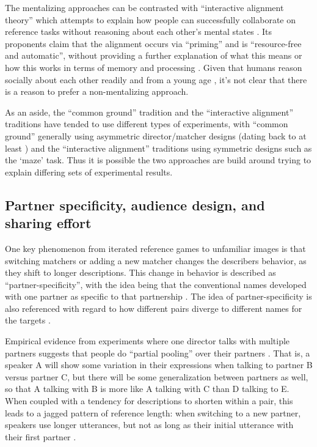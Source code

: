 \documentclass[]{article}
\begin{document}
The mentalizing approaches can be contrasted with ``interactive alignment theory'' which attempts to explain how people can successfully collaborate on reference tasks without reasoning about each other's mental states \citep{pickering2004, gandolfi2022}. Its proponents claim that the alignment occurs via ``priming'' and is ``resource-free and automatic'', without providing a further explanation of what this means or how this works in terms of memory and processing \citep{pickering2004}.  Given that humans reason socially about each other readily and from a young age \citep{rakoczy2022}, it's not clear that there is a reason to prefer a non-mentalizing approach. 

As an aside, the ``common ground'' tradition and the ``interactive alignment'' traditions have tended to use different types of experiments, with ``common ground'' generally using asymmetric director/matcher designs (dating back to at least \citet{krauss1966}) and the ``interactive alignment'' traditions using symmetric designs such as the `maze' task. Thus it is possible the two approaches are build around trying to explain differing sets of experimental results. 

\subsection{Partner specificity, audience design, and sharing effort}

One key phenomenon from iterated reference games to unfamiliar images is that switching matchers or adding a new matcher changes the describers behavior, as they shift to longer descriptions. This change in behavior is described as ``partner-specificity'', with the idea being that the conventional names developed with one partner as specific to that partnership \citep{brennan1996, metzing2003a, hawkinsc}. The idea of partner-specificity is also referenced with regard to how different pairs diverge to different names for the targets \citep{hawkins2020b}. 

Empirical evidence from experiments where one director talks with multiple partners suggests that people do ``partial pooling'' over their partners \citep{hawkins2021, yoon2014}. That is, a speaker A will show some variation in their expressions when talking to partner B versus partner C, but there will be some generalization between partners as well, so that A talking with B is more like A talking with C than D talking to E. When coupled with a tendency for descriptions to shorten within a pair, this leads to a jagged pattern of reference length: when switching to a new partner, speakers use longer utterances, but not as long as their initial utterance with their first partner \citep{yoon2019a}.  
\end{document}
